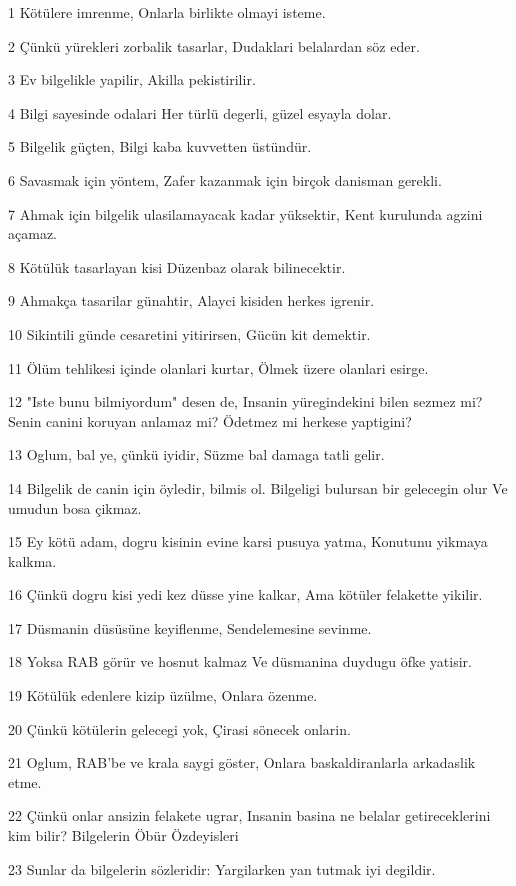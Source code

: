 \par 1 Kötülere imrenme, Onlarla birlikte olmayi isteme.
\par 2 Çünkü yürekleri zorbalik tasarlar, Dudaklari belalardan söz eder.
\par 3 Ev bilgelikle yapilir, Akilla pekistirilir.
\par 4 Bilgi sayesinde odalari Her türlü degerli, güzel esyayla dolar.
\par 5 Bilgelik güçten, Bilgi kaba kuvvetten üstündür.
\par 6 Savasmak için yöntem, Zafer kazanmak için birçok danisman gerekli.
\par 7 Ahmak için bilgelik ulasilamayacak kadar yüksektir, Kent kurulunda agzini açamaz.
\par 8 Kötülük tasarlayan kisi Düzenbaz olarak bilinecektir.
\par 9 Ahmakça tasarilar günahtir, Alayci kisiden herkes igrenir.
\par 10 Sikintili günde cesaretini yitirirsen, Gücün kit demektir.
\par 11 Ölüm tehlikesi içinde olanlari kurtar, Ölmek üzere olanlari esirge.
\par 12 "Iste bunu bilmiyordum" desen de, Insanin yüregindekini bilen sezmez mi? Senin canini koruyan anlamaz mi? Ödetmez mi herkese yaptigini?
\par 13 Oglum, bal ye, çünkü iyidir, Süzme bal damaga tatli gelir.
\par 14 Bilgelik de canin için öyledir, bilmis ol. Bilgeligi bulursan bir gelecegin olur Ve umudun bosa çikmaz.
\par 15 Ey kötü adam, dogru kisinin evine karsi pusuya yatma, Konutunu yikmaya kalkma.
\par 16 Çünkü dogru kisi yedi kez düsse yine kalkar, Ama kötüler felakette yikilir.
\par 17 Düsmanin düsüsüne keyiflenme, Sendelemesine sevinme.
\par 18 Yoksa RAB görür ve hosnut kalmaz Ve düsmanina duydugu öfke yatisir.
\par 19 Kötülük edenlere kizip üzülme, Onlara özenme.
\par 20 Çünkü kötülerin gelecegi yok, Çirasi sönecek onlarin.
\par 21 Oglum, RAB'be ve krala saygi göster, Onlara baskaldiranlarla arkadaslik etme.
\par 22 Çünkü onlar ansizin felakete ugrar, Insanin basina ne belalar getireceklerini kim bilir? Bilgelerin Öbür Özdeyisleri
\par 23 Sunlar da bilgelerin sözleridir: Yargilarken yan tutmak iyi degildir.
